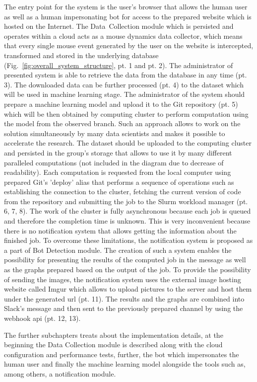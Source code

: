 The entry point for the system is the user's browser that allows the human user as well as a human impersonating bot for access to the prepared website which is hosted on the Internet.
The \mbox{Data Collection} module which is persisted and operates within a cloud acts as a mouse dynamics data collector, which means that every single mouse event generated by the user on the website is intercepted, transformed and stored in the underlying database (Fig.~\ref{fig:overall_system_structure}, pt. 1 and pt. 2).
The administrator of presented system is able to retrieve the data from the database in any time (pt. 3).
The downloaded data can be further processed (pt. 4) to the dataset which will be used in machine learning stage.
The administrator of the system should prepare a machine learning model and upload it to the Git repository (pt. 5) which will be then obtained by computing cluster to perform computation using the model from the observed branch.
Such an approach allows to work on the solution simultaneously by many data scientists and makes it possible to accelerate the research.
The dataset should be uploaded to the computing cluster and persisted in the group's storage that allows to use it by many different paralleled computations (not included in the diagram due to decrease of readability).
Each computation is requested from the local computer using prepared Git's 'deploy' alias that performs a sequence of operations such as establishing the connection to the cluster, fetching the current version of code from the repository and submitting the job to the Slurm workload manager (pt. 6, 7, 8).
The work of the cluster is fully asynchronous because each job is queued and therefore the completion time is unknown.
This is very inconvenient because there is no notification system that allows getting the information about the finished job.
To overcome these limitations, the notification system is proposed as a part of Bot Detection module.
The creation of such a system enables the possibility for presenting the results of the computed job in the message as well as the graphs prepared based on the output of the job.
To provide the possibility of sending the images, the notification system uses the external image hosting website called Imgur which allows to upload pictures to the server and host them under the generated \gls{url} (pt. 11).
The results and the graphs are combined into Slack's message and then sent to the previously prepared channel by using the webhook \gls{api} (pt. 12, 13).

The further subchapters treats about the implementation details, at the beginning the Data Collection module is described along with the cloud configuration and performance tests, further, the bot which impersonates the human user and finally the machine learning model alongside the tools such as, among others, a notification module.

